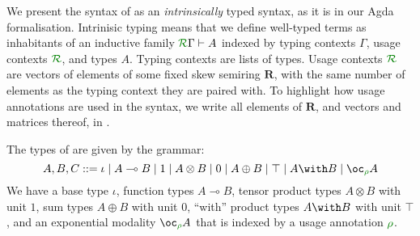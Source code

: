 \documentclass[submission,copyright,creativecommons]{eptcs}
\begin{document}
\begin{figure}[]
\end{figure}

We present the syntax of \name{} as an \emph{intrinsically} typed
syntax, as it is in our Agda formalisation. Intrinisic typing means
that we define well-typed terms as inhabitants of an inductive family
$\ctx\Gamma{R} \vdash A$ indexed by typing contexts $\Gamma$, usage
contexts $\resctx{R}$, and types $A$. Typing contexts are lists of
types. Usage contexts $\resctx{R}$ are vectors of elements of some
fixed skew semiring $\mathbf R$, with the same number of elements as
the typing context they are paired with. To highlight how usage
annotations are used in the syntax, we write all elements of
$\mathbf R$, and vectors and matrices thereof, in .



The types of \name{} are given by the grammar:
\begin{displaymath}
  A,B,C ::= \iota \mid A \multimap B \mid 1 \mid A \otimes B \mid 0 \mid A \oplus B \mid \top \mid A \with B \mid \excl{\rho} A
\end{displaymath}
We have a base type $\iota$, function types $A \multimap B$, tensor
product types $A \otimes B$ with unit $1$, sum types $A \oplus B$ with
unit $0$, ``with'' product types $A \with B$ with unit $\top$, and an
exponential modality $\excl{\rho} A$ that is indexed by a usage
annotation $\rescomment{\rho}$.
\end{document}
